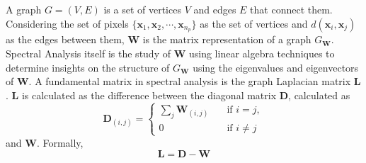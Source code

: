 A graph $G = (V,E)$ is a set of vertices $V$ and edges $E$ that connect them. Considering the set of pixels $\{\mathbf{x}_1, \mathbf{x}_2 , \cdots , \mathbf{x}_{n_p} \}$ as the set of vertices and $d(\mathbf{x}_i, \mathbf{x}_j)$ as the edges between them, $\mathbf{W}$ is the matrix representation of a graph $G_\mathbf{W}$. Spectral Analysis itself is the study of $\mathbf{W}$ using linear algebra techniques to determine insights on the structure of $G_\mathbf{W}$ using the eigenvalues and eigenvectors of $\mathbf{W}$. A fundamental matrix in spectral analysis is the graph Laplacian matrix $\mathbf{L}$. $\mathbf{L}$ is calculated as the difference between the diagonal matrix $\mathbf{D}$, calculated as
\begin{equation}
    \label{sc:d-mtx}
    \mathbf{D}_{(i,j)} = \begin{cases}
        \sum _{j}\mathbf{W}_{(i,j)} &\quad \text{if } i = j,\\
        0 & \quad \text{if } i \neq j
    \end{cases}
\end{equation}
and $\mathbf{W}$. Formally,
\begin{equation}
    \label{sc:laplacian-mtx}
    \mathbf{L} = \mathbf{D} - \mathbf{W}
\end{equation}
